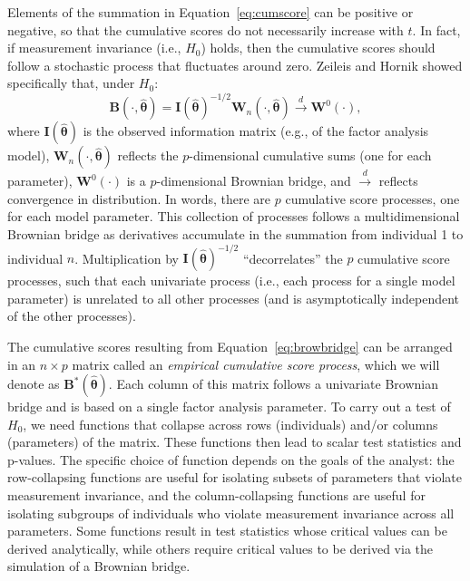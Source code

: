 \documentclass[man]{apa}
\begin{document}
Elements of the summation in Equation~\eqref{eq:cumscore}
can be positive or 
negative, so that the cumulative scores do not necessarily increase
with $t$.  In fact, if measurement invariance (i.e., $H_0$) holds,
then the cumulative scores should 
follow a stochastic process that fluctuates around zero.  
Zeileis and Hornik \citeyear{ZeiHor07} showed specifically that, under
$H_0$:
\begin{equation}
    \label{eq:browbridge}
{\bm{B}}(\cdot, \widehat{{\bm{\theta}}}) = {\bm{I}}(\widehat{{\bm{\theta}}})^{-1/2}{\bm{W}}_n(\cdot,\widehat{{\bm{\theta}}})
\overset{d}{\rightarrow} {\bm W}^{0}(\cdot), %
\end{equation}
where ${\bm{I}}(\widehat{{\bm{\theta}}})$ is the observed information
matrix (e.g., of the factor analysis model), ${\bm{W}}_n(\cdot,\widehat{{\bm{\theta}}})$ reflects the $p$-dimensional
cumulative sums (one for each parameter), ${\bm W}^{0}(\cdot)$ is a
$p$-dimensional Brownian bridge, and 
$\overset{d}{\rightarrow}$ reflects convergence in distribution.
In words, there are $p$ cumulative score processes, one for each
model parameter.  This collection of processes follows a
multidimensional Brownian bridge as derivatives accumulate in the 
summation from individual 1 to individual $n$.
Multiplication by ${\bm{I}}(\widehat{{\bm{\theta}}})^{-1/2}$ 
``decorrelates'' the $p$
cumulative score processes, such that each univariate process (i.e., each
process for a single model parameter) is unrelated to all other
processes (and is asymptotically independent of the other processes).

The cumulative scores resulting from Equation~\eqref{eq:browbridge}
can be arranged in an $n \times p$ matrix called an {\em{empirical
    cumulative score process}}, which we will denote as
${\bm{B}}^{\ast}(\widehat{\bm{\theta}})$.
Each column of this matrix follows a univariate Brownian bridge and is
based on a single factor analysis parameter. 
To carry out a test of $H_0$, we need functions that collapse across
rows (individuals) and/or columns (parameters) of the matrix.  
These
functions then lead to scalar test statistics and p-values.
The specific choice of function depends on the goals of the analyst:
the row-collapsing functions are useful for isolating subsets of
parameters that violate measurement invariance, and the
column-collapsing functions are useful for isolating subgroups of
individuals who violate measurement invariance across all parameters.
Some functions result in test
statistics whose critical values can be derived analytically, while
others require critical values to be derived via the
simulation of a Brownian bridge.
\end{document}
